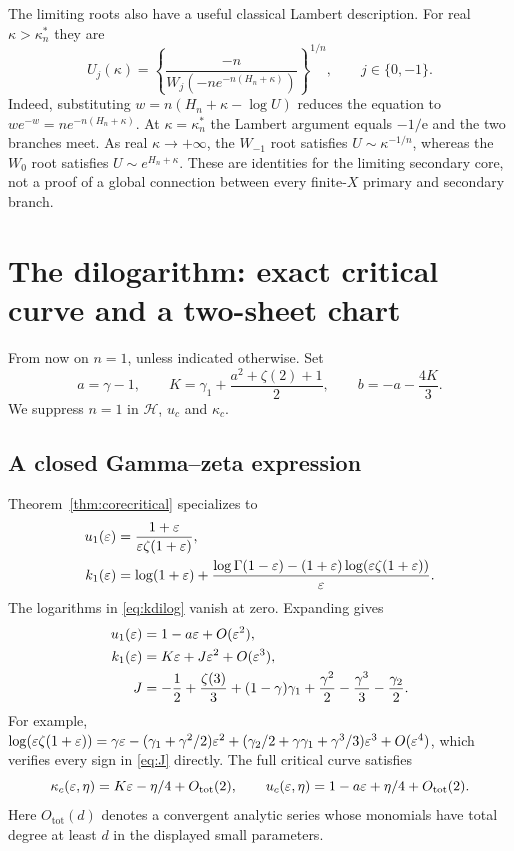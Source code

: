 \documentclass[11pt,a4paper]{article}
\numberwithin{equation}{section}
\theoremstyle{definition}\newtheorem{definition}[theorem]{Definition}
\theoremstyle{remark}\newtheorem{remark}[theorem]{Remark}
\newcommand{\HH}{\mathcal H}
\newcommand{\Ot}{O_{\mathrm{tot}}}
\begin{document}
The limiting roots also have a useful classical Lambert description. For
real $\kappa>\kappa_n^*$ they are
\begin{equation}\label{eq:secondaryLambert}
 U_j(\kappa)=\left\{
 \frac{-n}{W_j(-n e^{-n(H_n+\kappa)})}\right\}^{1/n},
 \qquad j\in\{0,-1\}.
\end{equation}
Indeed, substituting $w=n(H_n+\kappa-\log U)$ reduces the equation to
$we^{-w}=ne^{-n(H_n+\kappa)}$. At $\kappa=\kappa_n^*$ the Lambert
argument equals $-1/\mathrm e$ and the two branches meet. As real
$\kappa\to+\infty$, the $W_{-1}$ root satisfies $U\sim\kappa^{-1/n}$,
whereas the $W_0$ root satisfies $U\sim e^{H_n+\kappa}$.
These are identities for the limiting secondary core, not a proof of a
global connection between every finite-$X$ primary and secondary branch.

\section{The dilogarithm: exact critical curve and a two-sheet chart}
\label{sec:fold}
From now on $n=1$, unless indicated otherwise. Set
\begin{equation}\label{eq:abK}
 a=\gamma-1,\qquad
 K=\gamma_1+\frac{a^2+\zeta(2)+1}{2},\qquad
 b=-a-\frac{4K}{3}.
\end{equation}
We suppress $n=1$ in $\HH$, $u_c$ and $\kappa_c$.

\subsection{A closed Gamma--zeta expression}
Theorem~\ref{thm:corecritical} specializes to
\begin{align}
 u_1(\varepsilon)&=\frac{1+\varepsilon}{\varepsilon\zeta(1+\varepsilon)},\label{eq:udilog}\\
 k_1(\varepsilon)&=\log(1+\varepsilon)+
 \frac{\log\Gamma(1-\varepsilon)
                  -(1+\varepsilon)\log(\varepsilon\zeta(1+\varepsilon))}{\varepsilon}.
                                                        \label{eq:kdilog}
\end{align}
The logarithms in \eqref{eq:kdilog} vanish at zero. Expanding gives
\begin{align}
 u_1(\varepsilon)&=1-a\varepsilon+O(\varepsilon^2),\label{eq:udilogfirst}\\
 k_1(\varepsilon)&=K\varepsilon+J\varepsilon^2+O(\varepsilon^3),\label{eq:kdilogsecond}\\
 J&=-\frac12+\frac{\zeta(3)}3+(1-\gamma)\gamma_1
          +\frac{\gamma^2}{2}-\frac{\gamma^3}{3}-\frac{\gamma_2}{2}.
                                                        \label{eq:J}
\end{align}
For example,
$\log(\varepsilon\zeta(1+\varepsilon))=
 \gamma\varepsilon-(\gamma_1+\gamma^2/2)\varepsilon^2+
 (\gamma_2/2+\gamma\gamma_1+\gamma^3/3)\varepsilon^3+O(\varepsilon^4)$,
which verifies every sign in \eqref{eq:J} directly.
The full critical curve satisfies
\begin{equation}\label{eq:dilogcriticalfirst}
 \kappa_c(\eps,\eta)=K\eps-\eta/4+\Ot(2),\qquad
 u_c(\eps,\eta)=1-a\eps+\eta/4+\Ot(2).
\end{equation}
Here $\Ot(d)$ denotes a convergent analytic series whose monomials have
total degree at least $d$ in the displayed small parameters.
\end{document}
